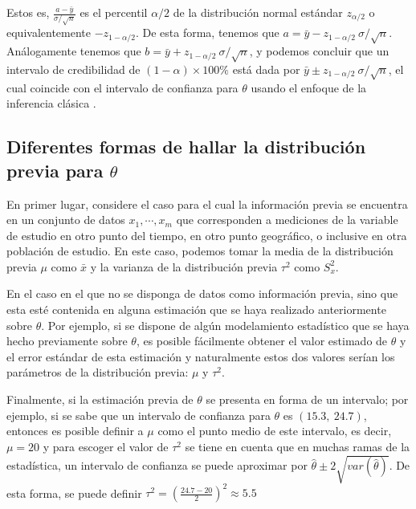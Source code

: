 \documentclass[
  10pt,
  spanish,
]{book}
\theoremstyle{definition}
\theoremstyle{definition}
\theoremstyle{definition}
\theoremstyle{definition}
\theoremstyle{remark}
\begin{document}
Estos es, \(\frac{a-\bar{y}}{\sigma/\sqrt{n}}\) es el percentil \(\alpha/2\) de la distribución normal estándar \(z_{\alpha/2}\) o equivalentemente \(-z_{1-\alpha/2}\). De esta forma, tenemos que \(a=\bar{y}-z_{1-\alpha/2}\ \sigma/\sqrt{n}\). Análogamente tenemos que \(b=\bar{y}+z_{1-\alpha/2}\ \sigma/\sqrt{n}\), y podemos concluir que un intervalo de credibilidad de \((1-\alpha)\times 100\%\) está dada por \(\bar{y}\pm z_{1-\alpha/2}\ \sigma/\sqrt{n}\), el cual coincide con el intervalo de confianza para \(\theta\) usando el enfoque de la inferencia clásica \citep{Zhang}.

\hypertarget{diferentes-formas-de-hallar-la-distribuciuxf3n-previa-para-theta}{%
\subsection{\texorpdfstring{Diferentes formas de hallar la distribución previa para \(\theta\)}{Diferentes formas de hallar la distribución previa para \textbackslash theta}}\label{diferentes-formas-de-hallar-la-distribuciuxf3n-previa-para-theta}}

En primer lugar, considere el caso para el cual la información previa se encuentra en un conjunto de datos \(x_1,\cdots,x_{m}\) que corresponden a mediciones de la variable de estudio en otro punto del tiempo, en otro punto geográfico, o inclusive en otra población de estudio. En este caso, podemos tomar la media de la distribución previa \(\mu\) como \(\bar{x}\) y la varianza de la distribución previa \(\tau^2\) como \(S^2_x\).

En el caso en el que no se disponga de datos como información previa, sino que esta esté contenida en alguna estimación que se haya realizado anteriormente sobre \(\theta\). Por ejemplo, si se dispone de algún modelamiento estadístico que se haya hecho previamente sobre \(\theta\), es posible fácilmente obtener el valor estimado de \(\theta\) y el error estándar de esta estimación y naturalmente estos dos valores serían los parámetros de la distribución previa: \(\mu\) y \(\tau^2\).

Finalmente, si la estimación previa de \(\theta\) se presenta en forma de un intervalo; por ejemplo, si se sabe que un intervalo de confianza para \(\theta\) es \((15.3,\ 24.7)\), entonces es posible definir a \(\mu\) como el punto medio de este intervalo, es decir, \(\mu=20\) y para escoger el valor de \(\tau^2\) se tiene en cuenta que en muchas ramas de la estadística, un intervalo de confianza se puede aproximar por \(\hat{\theta}\pm 2\sqrt{var(\hat{\theta})}\). De esta forma, se puede definir \(\tau^2=\left(\frac{24.7-20}{2}\right)^2\approx5.5\)
\end{document}
